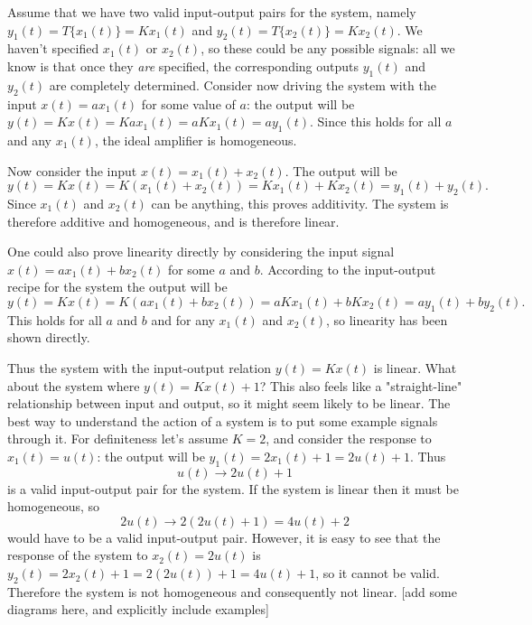 \documentclass[10pt]{beamer}
\begin{document}
Assume that we have two valid input-output pairs for the system, namely $y_1(t) = T\{x_1(t)\} = K x_1(t)$ and $y_2(t) = T\{x_2(t)\} = K x_2(t)$.  We haven't specified $x_1(t)$ or $x_2(t)$, so these could be any possible signals:  all we know is that once they {\em are} specified, the corresponding outputs $y_1(t)$ and $y_2(t)$ are completely determined.  Consider now driving the system with the input $x(t) = a x_1(t)$ for some value of $a$:  the output will be $y(t) = K x(t) = K a x_1(t) = a K x_1(t) = a y_1(t)$.  Since this holds for all $a$ and any $x_1(t)$, the ideal amplifier is homogeneous.

Now consider the input $x(t) = x_1(t) + x_2(t)$.  The output will be 
\begin{equation*}
  y(t) = K x(t) = K (x_1(t) + x_2(t)) = K x_1(t) + K x_2(t) = y_1(t) + y_2(t).
\end{equation*}
Since $x_1(t)$ and $x_2(t)$ can be anything, this proves additivity.  The system is therefore additive and homogeneous, and is therefore linear.

One could also prove linearity directly by considering the input signal $x(t) = a x_1(t) + b x_2(t)$ for some $a$ and $b$.  According to the input-output recipe for the system the output will be
\begin{equation*}
  y(t) = K x(t) = K (a x_1(t) + b x_2(t)) = a K x_1(t) + b K x_2(t) = a y_1(t) + b y_2(t).
\end{equation*}
This holds for all $a$ and $b$ and for any $x_1(t)$ and $x_2(t)$, so linearity has been shown directly.

Thus the system with the input-output relation $y(t) = K x(t)$ is linear.  What about the system where $y(t) = K x(t) + 1$?  This also feels like a "straight-line" relationship between input and output, so it might seem likely to be linear.  The best way to understand the action of a system is to put some example signals through it.  For definiteness let's assume $K=2$, and consider the response to $x_1(t) = u(t)$:  the output will be $y_1(t) = 2 x_1(t) + 1 = 2 u(t) + 1$.  Thus
\begin{equation*}
  u(t) \longrightarrow 2 u(t) + 1
\end{equation*}
is a valid input-output pair for the system.  If the system is linear then it must be homogeneous, so
\begin{equation*}
  2 u(t) \longrightarrow 2 (2 u(t) + 1) = 4 u(t) + 2
\end{equation*}
would have to be a valid input-output pair.  However, it is easy to see that the response of the system to $x_2(t) = 2 u(t)$ is $y_2(t) = 2 x_2(t) + 1 = 2 (2 u(t)) + 1 = 4 u(t) + 1$, so it cannot be valid.  Therefore the system is not homogeneous and consequently not linear.
[add some diagrams here, and explicitly include examples]
\end{document}
